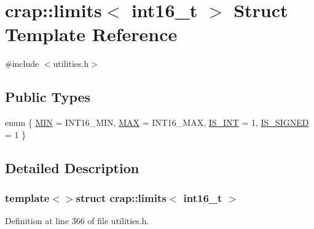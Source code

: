 \hypertarget{structcrap_1_1limits_3_01int16__t_01_4}{}\section{crap\+:\+:limits$<$ int16\+\_\+t $>$ Struct Template Reference}
\label{structcrap_1_1limits_3_01int16__t_01_4}


{\ttfamily \#include $<$utilities.\+h$>$}

\subsection*{Public Types}
\begin{DoxyCompactItemize}
\item 
enum \{ \hyperlink{structcrap_1_1limits_3_01int16__t_01_4_a97ebcf5c0399ee91cbd52333b3fc9335a1de03cf78457841a6f3c7480dfad60a2}{M\+I\+N} = I\+N\+T16\+\_\+\+M\+I\+N, 
\hyperlink{structcrap_1_1limits_3_01int16__t_01_4_a97ebcf5c0399ee91cbd52333b3fc9335aed380ff9e38962978a1ed0e3dbb287e8}{M\+A\+X} = I\+N\+T16\+\_\+\+M\+A\+X, 
\hyperlink{structcrap_1_1limits_3_01int16__t_01_4_a97ebcf5c0399ee91cbd52333b3fc9335a075153b3e346cc6ed4d750497e392942}{I\+S\+\_\+\+I\+N\+T} = 1, 
\hyperlink{structcrap_1_1limits_3_01int16__t_01_4_a97ebcf5c0399ee91cbd52333b3fc9335a245868bae7493a2fa5764af28a1ffc3d}{I\+S\+\_\+\+S\+I\+G\+N\+E\+D} = 1
 \}
\end{DoxyCompactItemize}


\subsection{Detailed Description}
\subsubsection*{template$<$$>$struct crap\+::limits$<$ int16\+\_\+t $>$}



Definition at line 366 of file utilities.\+h.



